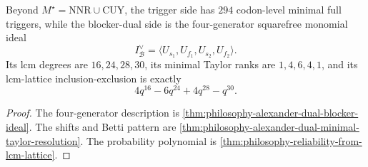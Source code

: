 \begin{theorem}
\label{thm:philosophy-alexander-dual-trigger-algebra-theorem}
Beyond $M^{\star}=\mathrm{NNR}\cup\mathrm{CUY}$, the trigger side has
$294$ codon-level minimal full triggers, while the blocker-dual side is
the four-generator squarefree monomial ideal
$$
  I_{\mathcal{B}}^{\vee}
  =
  \langle
  U_{s_{1}},U_{f_{1}},U_{s_{2}},U_{f_{2}}
  \rangle.
$$
Its lcm degrees are $16,24,28,30$, its minimal Taylor ranks are
$1,4,6,4,1$, and its lcm-lattice inclusion-exclusion is exactly
$$
  4q^{16}-6q^{24}+4q^{28}-q^{30}.
$$
\end{theorem}
\begin{proof}
The four-generator description is
\autoref{thm:philosophy-alexander-dual-blocker-ideal}. The shifts and
Betti pattern are
\autoref{thm:philosophy-alexander-dual-minimal-taylor-resolution}. The
probability polynomial is
\autoref{thm:philosophy-reliability-from-lcm-lattice}.
\end{proof}

